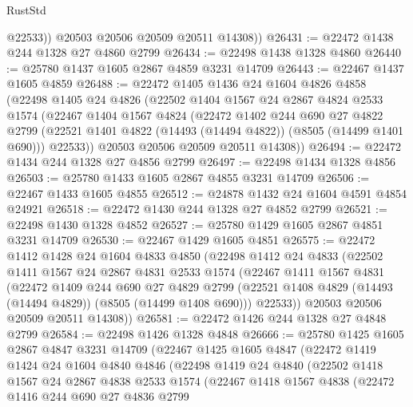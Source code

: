 \begin{lexlean}{RustStd}
\begin{coremodule}
            @22533))
        @20503
        @20506
        @20509
        @20511
        @14308))
@26431 := @22472 @1438 @244 @1328 @27 @4860 @2799
@26434 := @22498 @1438 @1328 @4860
@26440 := @25780 @1437 @1605 @2867 @4859 @3231 @14709
@26443 := @22467 @1437 @1605 @4859
@26488 := @22472
    @1405
    @1436
    @24
    @1604
    @4826
    @4858
    (@22498
      @1405
      @24
      @4826
      (@22502
        @1404
        @1567
        @24
        @2867
        @4824
        @2533
        @1574
        (@22467
          @1404
          @1567
          @4824
          (@22472
            @1402
            @244
            @690
            @27
            @4822
            @2799
            (@22521 @1401 @4822 (@14493 (@14494 @4822)) (@8505 (@14499 @1401 @690)))
            @22533))
        @20503
        @20506
        @20509
        @20511
        @14308))
@26494 := @22472 @1434 @244 @1328 @27 @4856 @2799
@26497 := @22498 @1434 @1328 @4856
@26503 := @25780 @1433 @1605 @2867 @4855 @3231 @14709
@26506 := @22467 @1433 @1605 @4855
@26512 := @24878 @1432 @24 @1604 @4591 @4854 @24921
@26518 := @22472 @1430 @244 @1328 @27 @4852 @2799
@26521 := @22498 @1430 @1328 @4852
@26527 := @25780 @1429 @1605 @2867 @4851 @3231 @14709
@26530 := @22467 @1429 @1605 @4851
@26575 := @22472
    @1412
    @1428
    @24
    @1604
    @4833
    @4850
    (@22498
      @1412
      @24
      @4833
      (@22502
        @1411
        @1567
        @24
        @2867
        @4831
        @2533
        @1574
        (@22467
          @1411
          @1567
          @4831
          (@22472
            @1409
            @244
            @690
            @27
            @4829
            @2799
            (@22521 @1408 @4829 (@14493 (@14494 @4829)) (@8505 (@14499 @1408 @690)))
            @22533))
        @20503
        @20506
        @20509
        @20511
        @14308))
@26581 := @22472 @1426 @244 @1328 @27 @4848 @2799
@26584 := @22498 @1426 @1328 @4848
@26666 := @25780
    @1425
    @1605
    @2867
    @4847
    @3231
    @14709
    (@22467
      @1425
      @1605
      @4847
      (@22472
        @1419
        @1424
        @24
        @1604
        @4840
        @4846
        (@22498
          @1419
          @24
          @4840
          (@22502
            @1418
            @1567
            @24
            @2867
            @4838
            @2533
            @1574
            (@22467
              @1418
              @1567
              @4838
              (@22472
                @1416
                @244
                @690
                @27
                @4836
                @2799

\end{coremodule}
\end{lexlean}
